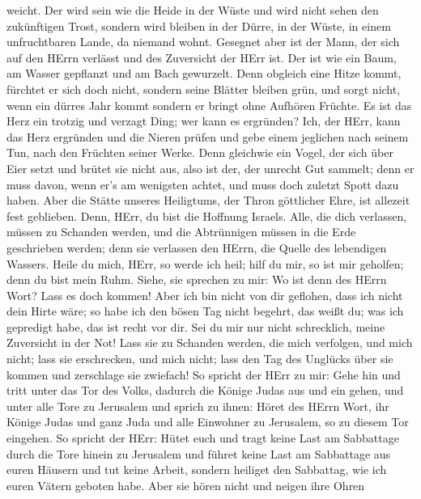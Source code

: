 weicht.  Der wird sein wie die Heide in der Wüste und wird
nicht sehen den zukünftigen Trost, sondern wird bleiben in der Dürre, in
der Wüste, in einem unfruchtbaren Lande, da niemand wohnt. 
Gesegnet aber ist der Mann, der sich auf den HErrn verlässt und des
Zuversicht der HErr ist.  Der ist wie ein Baum, am Wasser
gepflanzt und am Bach gewurzelt. Denn obgleich eine Hitze kommt,
fürchtet er sich doch nicht, sondern seine Blätter bleiben grün, und
sorgt nicht, wenn ein dürres Jahr kommt sondern er bringt ohne Aufhören
Früchte.  Es ist das Herz ein trotzig und verzagt Ding; wer
kann es ergründen?  Ich, der HErr, kann das Herz ergründen
und die Nieren prüfen und gebe einem jeglichen nach seinem Tun, nach den
Früchten seiner Werke.  Denn gleichwie ein Vogel, der sich
über Eier setzt und brütet sie nicht aus, also ist der, der unrecht Gut
sammelt; denn er muss davon, wenn er's am wenigsten achtet, und muss
doch zuletzt Spott dazu haben.  Aber die Stätte unseres
Heiligtums, der Thron göttlicher Ehre, ist allezeit fest geblieben.
 Denn, HErr, du bist die Hoffnung Israels. Alle, die dich
verlassen, müssen zu Schanden werden, und die Abtrünnigen müssen in die
Erde geschrieben werden; denn sie verlassen den HErrn, die Quelle des
lebendigen Wassers.  Heile du mich, HErr, so werde ich
heil; hilf du mir, so ist mir geholfen; denn du bist mein Ruhm.
 Siehe, sie sprechen zu mir: Wo ist denn des HErrn Wort?
Lass es doch kommen!  Aber ich bin nicht von dir geflohen,
dass ich nicht dein Hirte wäre; so habe ich den bösen Tag nicht begehrt,
das weißt du; was ich gepredigt habe, das ist recht vor dir.
 Sei du mir nur nicht schrecklich, meine Zuversicht in der
Not!  Lass sie zu Schanden werden, die mich verfolgen, und
mich nicht; lass sie erschrecken, und mich nicht; lass den Tag des
Unglücks über sie kommen und zerschlage sie zwiefach!  So
spricht der HErr zu mir: Gehe hin und tritt unter das Tor des Volks,
dadurch die Könige Judas aus und ein gehen, und unter alle Tore zu
Jerusalem  und sprich zu ihnen: Höret des HErrn Wort, ihr
Könige Judas und ganz Juda und alle Einwohner zu Jerusalem, so zu diesem
Tor eingehen.  So spricht der HErr: Hütet euch und tragt
keine Last am Sabbattage durch die Tore hinein zu Jerusalem
 und führet keine Last am Sabbattage aus euren Häusern und
tut keine Arbeit, sondern heiliget den Sabbattag, wie ich euren Vätern
geboten habe.  Aber sie hören nicht und neigen ihre Ohren
